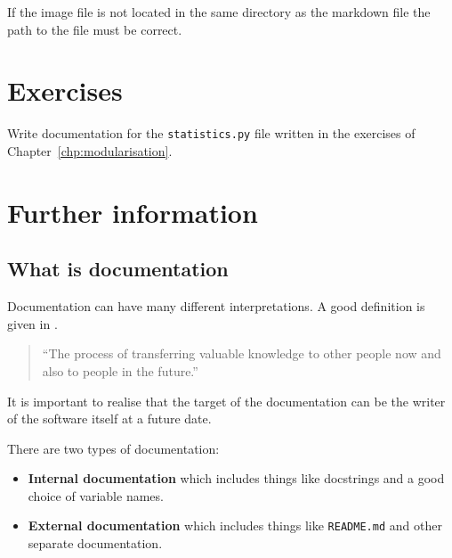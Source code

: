 \begin{note}

If the image file is not located in the same directory as the markdown file the
path to the file must be correct.
\end{note}




\section{Exercises}
\label{\detokenize{building-tools/06-documentation/exercises/main:exercises}}\label{\detokenize{building-tools/06-documentation/exercises/main:documentation-exercises}}\label{\detokenize{building-tools/06-documentation/exercises/main::doc}}

Write documentation for the \texttt{statistics.py} file written in the exercises of
Chapter~\ref{chp:modularisation}.


\section{Further information}
\label{\detokenize{building-tools/06-documentation/why/main:further-information}}\label{\detokenize{building-tools/06-documentation/why/main:documentation-further-information}}\label{\detokenize{building-tools/06-documentation/why/main::doc}}

\subsection{What is documentation}
\label{\detokenize{building-tools/06-documentation/why/main:what-is-documentation}}

Documentation can have many different interpretations. A good definition is
given in \cite{martraire2019living}.

\begin{quote}
``The process of transferring valuable knowledge to other people now and also to
people in the future.''
\end{quote}

\begin{note}
It is important to realise that the target of the documentation can be the
writer of the software itself at a future date.
\end{note}


There are two types of documentation:
\begin{itemize}
\item 

\textbf{Internal documentation} which includes things like docstrings and a good
choice of variable names.

\item 

\textbf{External documentation} which includes things like \texttt{README.md} and other
separate documentation.

\end{itemize}


